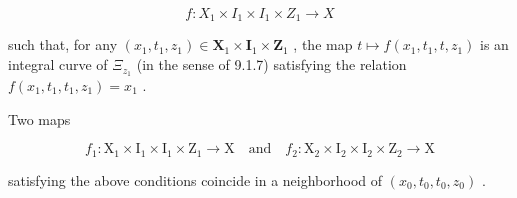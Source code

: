 \[
f \colon X _ {1} \times I _ {1} \times I _ {1} \times Z _ {1} \rightarrow X
\]

such that, for any \((x_{1}, t_{1}, z_{1}) \in \mathbf{X}_{1} \times \mathbf{I}_{1} \times \mathbf{Z}_{1}\) , the map \(t \mapsto f(x_{1}, t_{1}, t, z_{1})\) is an integral curve of \(\Xi_{z_{1}}\) (in the sense of 9.1.7) satisfying the relation \(f(x_{1}, t_{1}, t_{1}, z_{1}) = x_{1}\) .

Two maps

\[
f _ {1}: \mathrm{X} _ {1} \times \mathrm{I} _ {1} \times \mathrm{I} _ {1} \times \mathrm{Z} _ {1} \rightarrow \mathrm{X} \quad \text {and} \quad f _ {2}: \mathrm{X} _ {2} \times \mathrm{I} _ {2} \times \mathrm{I} _ {2} \times \mathrm{Z} _ {2} \rightarrow \mathrm{X}
\]

satisfying the above conditions coincide in a neighborhood of \((x_{0}, t_{0}, t_{0}, z_{0})\) .

